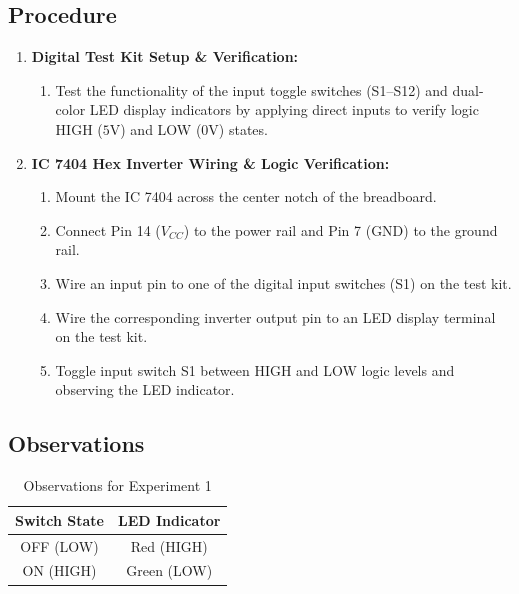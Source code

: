 \documentclass[11pt, a4paper]{article}
\begin{document}
\subsection{Procedure}
\begin{enumerate}
    \item \textbf{Digital Test Kit Setup \& Verification:}
    \begin{enumerate}
        \item Test the functionality of the input toggle switches (S1--S12) and dual-color LED display indicators by applying direct inputs to verify logic HIGH ($5\text{V}$) and LOW ($0\text{V}$) states.
    \end{enumerate}
    
    \item \textbf{IC 7404 Hex Inverter Wiring \& Logic Verification:}
    \begin{enumerate}
        \item Mount the IC 7404 across the center notch of the breadboard.
        \item Connect Pin 14 ($V_{CC}$) to the power rail and Pin 7 ($\text{GND}$) to the ground rail.
        \item Wire an input pin to one of the digital input switches (S1) on the test kit.
        \item Wire the corresponding inverter output pin to an LED display terminal on the test kit.
        \item Toggle input switch S1 between HIGH and LOW logic levels and observing the LED indicator.
    \end{enumerate}
\end{enumerate}

\subsection{Observations}
\begin{table}[H]
    \centering
    \caption{Observations for Experiment 1}
    \vspace{0.2cm}

    \begin{tabular}{cc}
        \toprule
        \textbf{Switch State} & \textbf{LED Indicator} \\
        \midrule
        OFF (LOW) & Red (HIGH) \\
        ON (HIGH) & Green (LOW) \\
        \bottomrule
    \end{tabular}
\end{table}
\end{document}
